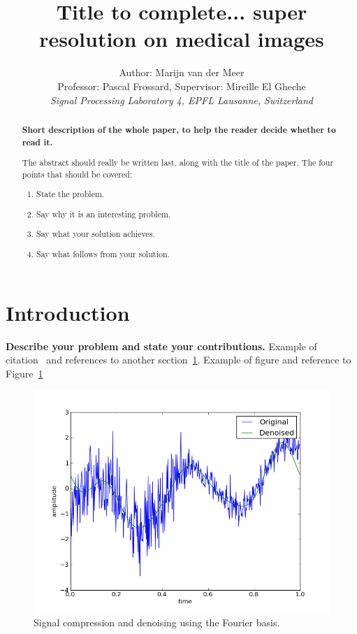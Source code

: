 \documentclass[10pt,conference,compsocconf]{IEEEtran}
\begin{document}
\title{Title to complete... super resolution on medical images}
\author{
  Author: Marijn van der Meer\\
  Professor: Pascal Frossard, Supervisor: Mireille El Gheche \\
  \textit{Signal Processing Laboratory 4, EPFL Lausanne, Switzerland}
}

\maketitle

\begin{abstract}
\textbf{ Short description of the whole paper, to help the
  reader decide whether to read it.}

The abstract should really be written last, along with the title of
the paper. The four points that should be covered:
\begin{enumerate}
\item State the problem.
\item Say why it is an interesting problem.
\item Say what your solution achieves.
\item Say what follows from your solution.
\end{enumerate}
 \end{abstract}

\section{Introduction}\label{sec:introduction}
\textbf{Describe your problem and state your
  contributions.}
  Example of citation~\cite{jones08}
and references to another section~\ref{sec:introduction}. Example of figure and reference to Figure~\ref{fig:denoise-fourier} \begin{figure}[tbp]
  \centering
  \includegraphics[width=\columnwidth]{denoised_signal_1d}
  \caption{Signal compression and denoising using the Fourier basis.}
  \vspace{-3mm}
  \label{fig:denoise-fourier}
\end{figure}
\end{document}
